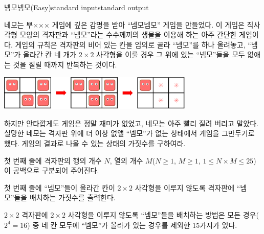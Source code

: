 \begin{problem}{넴모넴모(Easy)}{standard input}{standard output}

네모는 뿌××× 게임에 깊은 감명을 받아 ``넴모넴모'' 게임을 만들었다. 이 게임은 직사각형 모양의 격자판과 ``넴모''라는 수수께끼의 생물을 이용해 하는 아주 간단한 게임이다. 게임의 규칙은 격자판의 비어 있는 칸을 임의로 골라 ``넴모''를 하나 올려놓고, ``넴모''가 올라간 칸 네 개가 $2 \times 2$ 사각형을 이룰 경우 그 위에 있는 ``넴모''들을 모두 없애는 것을 질릴 때까지 반복하는 것이다.

\begin{center}
  \includegraphics[width=0.7\textwidth]{nemo.png}
\end{center}

하지만 안타깝게도 게임은 정말 재미가 없었고, 네모는 아주 빨리 질려 버리고 말았다. 실망한 네모는 격자판 위에 더 이상 없앨 ``넴모''가 없는 상태에서 게임을 그만두기로 했다. 게임의 결과로 나올 수 있는 상태의 가짓수를 구하여라.

\InputFile
첫 번째 줄에 격자판의 행의 개수 $N$, 열의 개수 $M$($N \ge 1$, $M \ge 1$, $1 \le N \times M \le 25$)이 공백으로 구분되어 주어진다.

\OutputFile
첫 번째 줄에 ``넴모''들이 올라간 칸이 $2 \times 2$ 사각형을 이루지 않도록 격자판에 ``넴모''들을 배치하는 가짓수를 출력한다.

\Example

\begin{example}
%
%
%
\end{example}

\Notes
$2 \times 2$ 격자판에 $2 \times 2$ 사각형을 이루지 않도록 ``넴모''들을 배치하는 방법은 모든 경우($2^{4}=16$) 중 네 칸 모두에 ``넴모''가 올라가 있는 경우를 제외한 $15$가지가 있다.

\end{problem}
